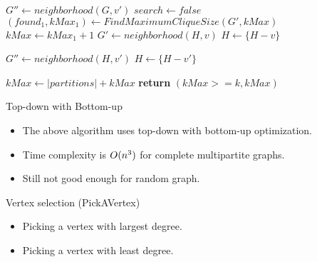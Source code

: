 \documentclass[landscape]{slides}
\begin{document}
\begin{algorithm}
	\begin{algorithmic}[1]
					\State $G'' \gets neighborhood(G, v')$
							\State $search \gets false$
						\EndIf
					\EndFor
						\State $(found_1, kMax_1) \gets FindMaximumCliqueSize(G', kMax)$
							\State $kMax \gets kMax_1 + 1$
						\EndIf
					\EndIf
				\EndIf
				\State $G' \gets neighborhood(H, v)$
				\State $H \gets \{H - v\}$
			
					\State $G'' \gets neighborhood(H, v')$
						\State $H \gets \{H - v'\}$
					\EndIf
	\end{algorithmic}
\end{algorithm}


\begin{algorithm}
	\begin{algorithmic}[1]
				\EndFor
			\EndWhile
			\State $kMax \gets |partitions| + kMax$
			\State \textbf{return} $(kMax >= k, kMax)$
		\EndFunction
	\end{algorithmic}
\end{algorithm}

\clearpage

\begin{slide}
	\begin{center}{\large Top-down with Bottom-up }\end{center}
	\begin{itemize}
		\setlength{\itemsep}{0pt}
		\setlength{\parskip}{20pt}
		\setlength{\parsep}{0pt}
		\item The above algorithm uses top-down with bottom-up optimization.
		\item Time complexity is $O(n\textsuperscript{3})$ for complete multipartite graphs.
		\item Still not good enough for random graph.
	\end{itemize}
\end{slide}

\begin{slide}
	\begin{center}{\large Vertex selection (PickAVertex) }\end{center}
	\begin{itemize}
		\setlength{\itemsep}{0pt}
		\setlength{\parskip}{20pt}
		\setlength{\parsep}{0pt}
		\item Picking a vertex with largest degree.
		\item Picking a vertex with least degree.
	\end{itemize}
\end{slide}
\end{document}

